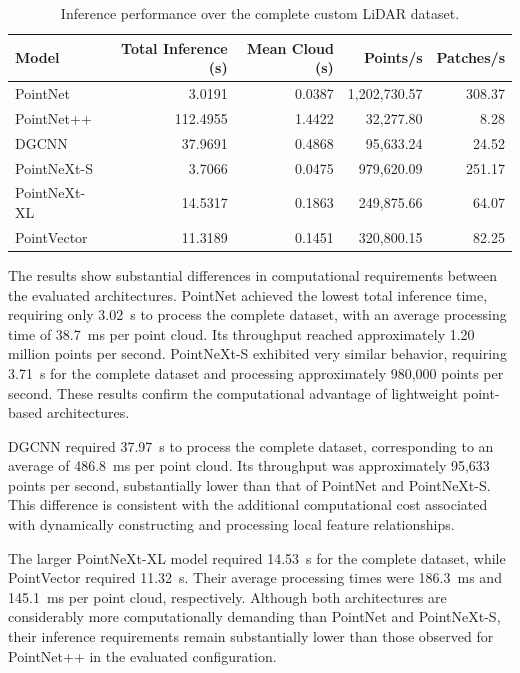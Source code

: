 \begin{table}[H]
\centering
\caption{Inference performance over the complete custom LiDAR dataset.}
\label{tab:inference_performance}
\begin{tabular}{|l|r|r|r|r|}
\hline
\textbf{Model} &
\textbf{Total Inference (s)} &
\textbf{Mean Cloud (s)} &
\textbf{Points/s} &
\textbf{Patches/s} \\
\hline
PointNet & 3.0191 & 0.0387 & 1,202,730.57 & 308.37 \\
\hline
PointNet++ & 112.4955 & 1.4422 & 32,277.80 & 8.28 \\
\hline
DGCNN & 37.9691 & 0.4868 & 95,633.24 & 24.52 \\
\hline
PointNeXt-S & 3.7066 & 0.0475 & 979,620.09 & 251.17 \\
\hline
PointNeXt-XL & 14.5317 & 0.1863 & 249,875.66 & 64.07 \\
\hline
PointVector & 11.3189 & 0.1451 & 320,800.15 & 82.25 \\
\hline
\end{tabular}
\end{table}

The results show substantial differences in computational requirements between the evaluated architectures. PointNet achieved the lowest total inference time, requiring only 3.02~s to process the complete dataset, with an average processing time of 38.7~ms per point cloud. Its throughput reached approximately 1.20 million points per second. PointNeXt-S exhibited very similar behavior, requiring 3.71~s for the complete dataset and processing approximately 980,000 points per second. These results confirm the computational advantage of lightweight point-based architectures.

DGCNN required 37.97~s to process the complete dataset, corresponding to an average of 486.8~ms per point cloud. Its throughput was approximately 95,633 points per second, substantially lower than that of PointNet and PointNeXt-S. This difference is consistent with the additional computational cost associated with dynamically constructing and processing local feature relationships.

The larger PointNeXt-XL model required 14.53~s for the complete dataset, while PointVector required 11.32~s. Their average processing times were 186.3~ms and 145.1~ms per point cloud, respectively. Although both architectures are considerably more computationally demanding than PointNet and PointNeXt-S, their inference requirements remain substantially lower than those observed for PointNet++ in the evaluated configuration.

